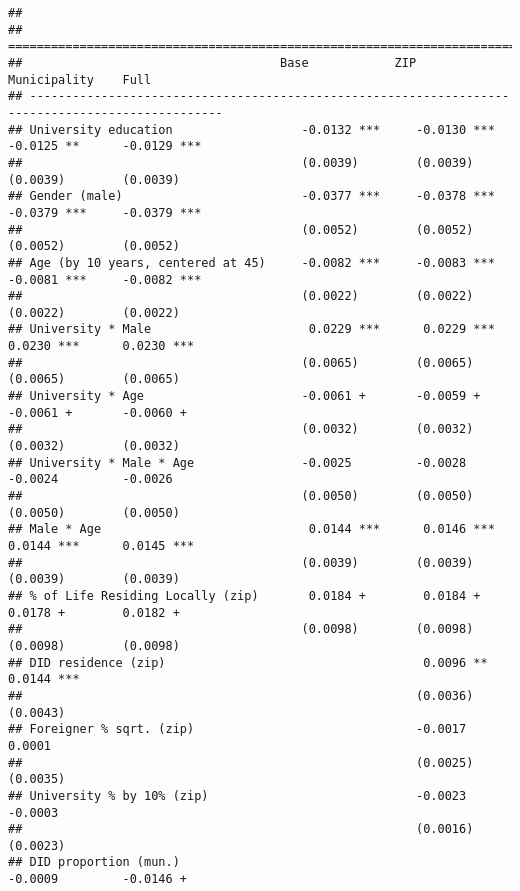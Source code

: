 \documentclass[
]{article}
\begin{document}
\begin{verbatim}
## 
## =================================================================================================
##                                    Base            ZIP             Municipality    Full          
## -------------------------------------------------------------------------------------------------
## University education                  -0.0132 ***     -0.0130 ***     -0.0125 **      -0.0129 ***
##                                       (0.0039)        (0.0039)        (0.0039)        (0.0039)   
## Gender (male)                         -0.0377 ***     -0.0378 ***     -0.0379 ***     -0.0379 ***
##                                       (0.0052)        (0.0052)        (0.0052)        (0.0052)   
## Age (by 10 years, centered at 45)     -0.0082 ***     -0.0083 ***     -0.0081 ***     -0.0082 ***
##                                       (0.0022)        (0.0022)        (0.0022)        (0.0022)   
## University * Male                      0.0229 ***      0.0229 ***      0.0230 ***      0.0230 ***
##                                       (0.0065)        (0.0065)        (0.0065)        (0.0065)   
## University * Age                      -0.0061 +       -0.0059 +       -0.0061 +       -0.0060 +  
##                                       (0.0032)        (0.0032)        (0.0032)        (0.0032)   
## University * Male * Age               -0.0025         -0.0028         -0.0024         -0.0026    
##                                       (0.0050)        (0.0050)        (0.0050)        (0.0050)   
## Male * Age                             0.0144 ***      0.0146 ***      0.0144 ***      0.0145 ***
##                                       (0.0039)        (0.0039)        (0.0039)        (0.0039)   
## % of Life Residing Locally (zip)       0.0184 +        0.0184 +        0.0178 +        0.0182 +  
##                                       (0.0098)        (0.0098)        (0.0098)        (0.0098)   
## DID residence (zip)                                    0.0096 **                       0.0144 ***
##                                                       (0.0036)                        (0.0043)   
## Foreigner % sqrt. (zip)                               -0.0017                          0.0001    
##                                                       (0.0025)                        (0.0035)   
## University % by 10% (zip)                             -0.0023                         -0.0003    
##                                                       (0.0016)                        (0.0023)   
## DID proportion (mun.)                                                 -0.0009         -0.0146 +  

\end{verbatim}
\end{document}
